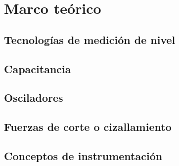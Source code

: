 \chapter{Marco teórico}

\section{Tecnologías de medición de nivel}

\section{Capacitancia}

\section{Osciladores}

\section{Fuerzas de corte o cizallamiento}

\section{Conceptos de instrumentación}

